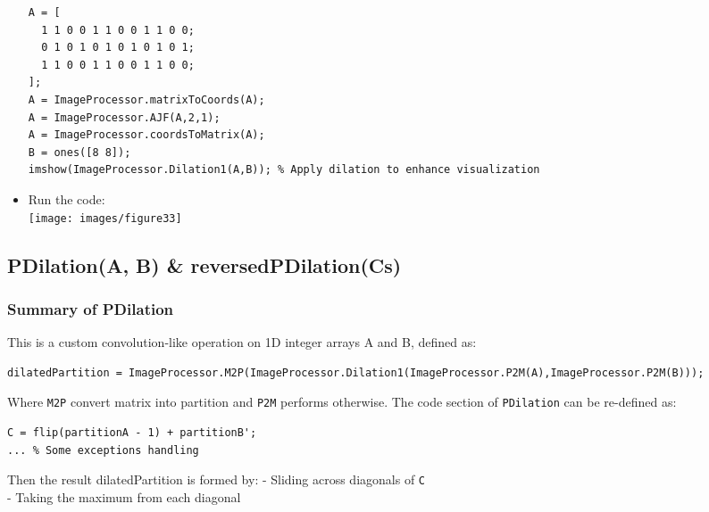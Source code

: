 \documentclass[11pt]{amsart}
\theoremstyle{remark}
\theoremstyle{definition}
\theoremstyle{remark}
\numberwithin{equation}{section}
\begin{document}
\begin{itemize}
\begin{verbatim}
A = [
  1 1 0 0 1 1 0 0 1 1 0 0;
  0 1 0 1 0 1 0 1 0 1 0 1;
  1 1 0 0 1 1 0 0 1 1 0 0;
];
A = ImageProcessor.matrixToCoords(A);
A = ImageProcessor.AJF(A,2,1);
A = ImageProcessor.coordsToMatrix(A);
B = ones([8 8]);
imshow(ImageProcessor.Dilation1(A,B)); % Apply dilation to enhance visualization
\end{verbatim}
\item
  Run the code:\\
  \texttt{[image: images/figure33]}
\end{itemize}

\subsection{PDilation(A, B) \&
reversedPDilation(Cs)}\label{pdilationa-b-reversedpdilationcs}

\subsubsection{Summary of PDilation}\label{summary-of-pdilation}

This is a custom convolution-like operation on 1D integer arrays A and
B, defined as:

\begin{verbatim}
dilatedPartition = ImageProcessor.M2P(ImageProcessor.Dilation1(ImageProcessor.P2M(A),ImageProcessor.P2M(B)));
\end{verbatim}

Where \texttt{M2P} convert matrix into partition and \texttt{P2M}
performs otherwise. The code section of \texttt{PDilation} can be
re-defined as:

\begin{verbatim}
C = flip(partitionA - 1) + partitionB';
... % Some exceptions handling
\end{verbatim}

Then the result dilatedPartition is formed by: - Sliding across
diagonals of \texttt{C}\\
- Taking the maximum from each diagonal
\end{document}
